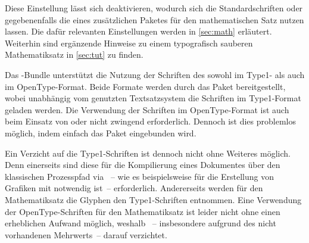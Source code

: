 \begin{DeclareEntity*}{}
\begin{DeclareEntity*}{}
\begin{DeclareEntity*}{}
Diese Einstellung lässt sich deaktivieren, wodurch sich die Standardschriften 
oder gegebenenfalls die eines zusätzlichen Paketes für den mathematischen Satz 
nutzen lassen. Die dafür relevanten Einstellungen werden in \autoref{sec:math} 
erläutert. Weiterhin sind ergänzende Hinweise zu einem typografisch sauberen
Mathematiksatz in \autoref{sec:tut} zu finden.


Das \TUDScript-Bundle unterstützt die Nutzung der Schriften des \CDs sowohl 
im Type1- als auch im OpenType-Format. Beide Formate werden durch das Paket 
 bereitgestellt, wobei unabhängig vom genutzten 
Textsatzsystem die Schriften im Type1-Format geladen werden. Die Verwendung der 
Schriften im OpenType-Format ist auch beim Einsatz von  oder 
 nicht zwingend erforderlich. Dennoch ist dies problemlos 
möglich, indem einfach das Paket  eingebunden wird.

Ein Verzicht auf die Type1-Schriften ist dennoch nicht ohne Weiteres möglich. 
Denn einerseits sind diese für die Kompilierung eines Dokumentes über den 
klassischen Prozesspfad via ~-- wie es 
beispielsweise für die Erstellung von Grafiken mit  notwendig 
ist~-- erforderlich. Andererseits werden für den Mathematiksatz die Glyphen den 
Type1-Schriften entnommen. Eine Verwendung der OpenType-Schriften für den 
Mathematiksatz ist leider nicht ohne einen erheblichen Aufwand möglich, weshalb 
\TUDScript~-- insbesondere aufgrund des nicht vorhandenen Mehrwerts~-- darauf 
verzichtet.%




\end{DeclareEntity*}
\end{DeclareEntity*}
\end{DeclareEntity*}
